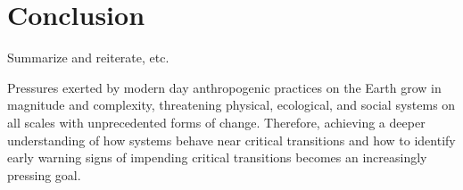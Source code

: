 \section{Conclusion}
\label{sec:conclusion}

Summarize and reiterate, etc.



Pressures exerted by modern day anthropogenic practices on the Earth grow in magnitude and complexity, threatening physical, ecological, and social systems on all scales with unprecedented forms of change. Therefore, achieving a deeper understanding of how systems behave near critical transitions and how to identify early warning signs of impending critical transitions becomes an increasingly pressing goal. 